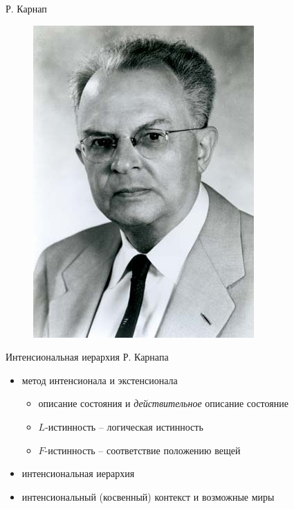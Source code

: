 \documentclass{beamer}
\begin{document}
\begin{frame}{Р. Карнап}
\begin{center}
	\begin{figure}[H]
		\includegraphics[scale=0.44]{carnap.jpg} 
	\end{figure}
\end{center}
\end{frame}

\begin{frame}{Интенсиональная иерархия Р. Карнапа}
\begin{itemize}
    \item метод интенсионала и экстенсионала
    \begin{itemize}
        \item описание состояния и \textit{действительное} описание состояние
        \item $L$-истинность -- логическая истинность
        \item $F$-истинность -- соответствие положению вещей
    \end{itemize}
	\item интенсиональная иерархия
	\item интенсиональный (косвенный) контекст и возможные миры
\end{itemize}
\end{frame}
\end{document}

